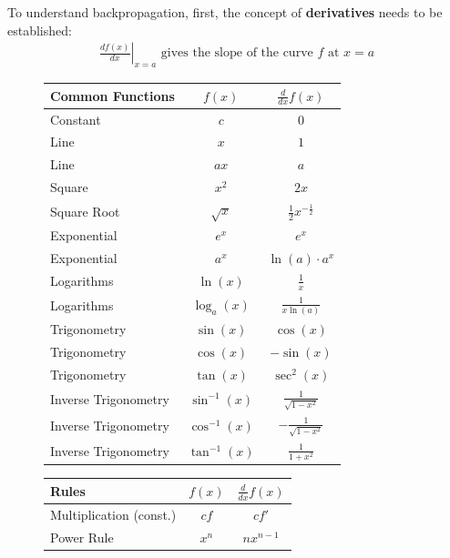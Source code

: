 To understand backpropagation, first, the concept of \textbf{derivatives} needs to be established:
\begin{align*}
  \left.\frac{d f(x)}{dx}\right|_{x=a} \text{ gives the slope of the curve } f \text{ at }x=a
\end{align*}
\begin{table}[h]
  \footnotesize
  \renewcommand{\arraystretch}{1.5}
  \centering
  \begin{subfigure}{0.45\textwidth}
  \begin{tabular}{|l|c|c|}
    \hline
    \textbf{Common Functions} & $f(x)$ & $\frac{d}{dx} f(x)$ \\
    \hline
    Constant & $c$ & $0$ \\
    Line & $x$ & $1$ \\
    Line & $ax$ & $a$ \\
    Square & $x^2$ & $2x$ \\
    Square Root & $\sqrt{x}$ & $\frac{1}{2}x^{-\frac{1}{2}}$ \\
    Exponential & $e^x$ & $e^x$ \\
    Exponential & $a^x$ & $\ln(a) \cdot a^x$ \\
    Logarithms & $\ln(x)$ & $\frac{1}{x}$ \\
    Logarithms & $\log_a(x)$ & $\frac{1}{x \ln(a)}$ \\
    Trigonometry & $\sin(x)$ & $\cos(x)$ \\
    Trigonometry & $\cos(x)$ & $-\sin(x)$ \\
    Trigonometry & $\tan(x)$ & $\sec^2(x)$ \\
    Inverse Trigonometry & $\sin^{-1}(x)$ & $\frac{1}{\sqrt{1-x^2}}$ \\
    Inverse Trigonometry & $\cos^{-1}(x)$ & $-\frac{1}{\sqrt{1-x^2}}$ \\
    Inverse Trigonometry & $\tan^{-1}(x)$ & $\frac{1}{1+x^2}$ \\
    \hline
  \end{tabular}
  \end{subfigure}
  \hspace{0.05\textwidth}  
  \begin{subfigure}{0.45\textwidth}
  \begin{tabular}{|l|c|c|}
    \hline
    \textbf{Rules} & $f(x)$ & $\frac{d}{dx} f(x)$  \\
    \hline
    Multiplication (const.) & $cf$ & $cf'$ \\
    Power Rule & $x^n$ & $nx^{n-1}$ \\

\end{tabular}
\end{subfigure}
\end{table}
